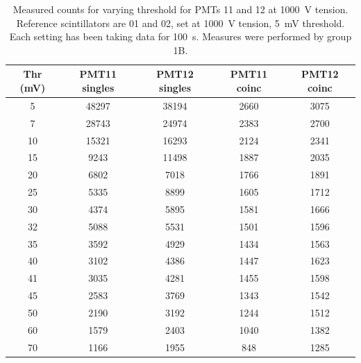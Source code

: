 \documentclass[../main.tex]{subfiles}
\begin{document}
    \begin{table}[b!]
        \centering
        \caption{Measured counts for varying threshold for PMTs 11 and 12 at \SI{1000}{\volt} tension. Reference scintillators are 01 and 02, set at \SI{1000}{\volt} tension, \SI{5}{\milli \volt} threshold. Each setting has been taking data for \SI{100}{\second}. Measures were performed by group 1B.}
        \label{tab:threshold1B}
            \begin{tabular}{|c|cc|cc|}
            \hline
            Thr (mV) & PMT11 singles & PMT12 singles & PMT11 coinc & PMT12 coinc \\ \hline
            \phantom{0}5        & 48297         & 38194         & 2660        & 3075        \\
            \phantom{0}7        & 28743         & 24974         & 2383        & 2700        \\
            10       & 15321         & 16293         & 2124        & 2341        \\
            15       & \phantom{0}9243          & 11498         & 1887        & 2035        \\
            20       & \phantom{0}6802          & \phantom{0}7018          & 1766        & 1891        \\
            25       & \phantom{0}5335          & \phantom{0}8899          & 1605        & 1712        \\
            30       & \phantom{0}4374          & \phantom{0}5895          & 1581        & 1666        \\
            32       & \phantom{0}5088          & \phantom{0}5531          & 1501        & 1596        \\
            35       & \phantom{0}3592          & \phantom{0}4929          & 1434        & 1563        \\
            40       & \phantom{0}3102          & \phantom{0}4386          & 1447        & 1623        \\
            41       & \phantom{0}3035          & \phantom{0}4281          & 1455        & 1598        \\
            45       & \phantom{0}2583          & \phantom{0}3769          & 1343        & 1542        \\
            50       & \phantom{0}2190          & \phantom{0}3192          & 1244        & 1512        \\
            60       & \phantom{0}1579          & \phantom{0}2403          & 1040        & 1382        \\
            70       & \phantom{0}1166          & \phantom{0}1955          & \phantom{0}848         & 1285        \\ \hline
            \end{tabular}
        \end{table}
\end{document}
